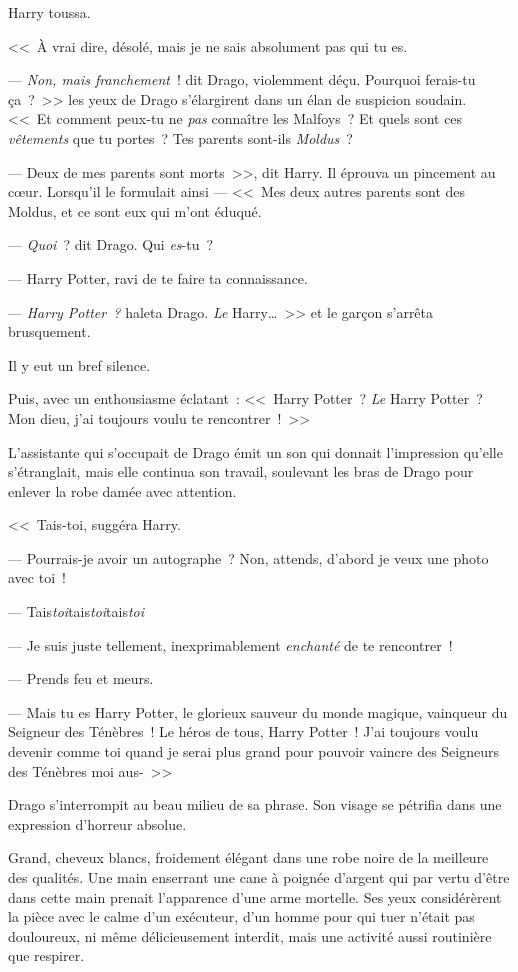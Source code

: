 Harry toussa. 

<<~À vrai dire, désolé, mais je ne sais absolument pas qui tu es.

--- \emph{Non, mais franchement}~! dit Drago, violemment déçu. Pourquoi ferais-tu ça~?~>> les yeux de Drago s'élargirent dans un élan de suspicion soudain. <<~Et comment peux-tu ne \emph{pas} connaître les Malfoys~? Et quels sont ces \emph{vêtements} que tu portes~? Tes parents sont-ils \emph{Moldus}~?

--- Deux de mes parents sont morts~>>, dit Harry. Il éprouva un pincement au cœur. Lorsqu'il le formulait ainsi — <<~Mes deux autres parents sont des Moldus, et ce sont eux qui m'ont éduqué.

--- \emph{Quoi}~? dit Drago. Qui \emph{es}-tu~?

--- Harry Potter, ravi de te faire ta connaissance.

--- \emph{Harry Potter~?} haleta Drago. \emph{Le} Harry…~>> et le garçon s'arrêta brusquement.

Il y eut un bref silence.

Puis, avec un enthousiasme éclatant~: <<~Harry Potter~? \emph{Le} Harry Potter~? Mon dieu, j'ai toujours voulu te rencontrer~!~>>

L'assistante qui s'occupait de Drago émit un son qui donnait l'impression qu'elle s'étranglait, mais elle continua son travail, soulevant les bras de Drago pour enlever la robe damée avec attention.

<<~Tais-toi, suggéra Harry.

--- Pourrais-je avoir un autographe~? Non, attends, d'abord je veux une photo avec toi~!

--- Tais\emph{toi}tais\emph{toi}tais\emph{toi}

--- Je suis juste tellement, inexprimablement \emph{enchanté} de te rencontrer~!

--- Prends feu et meurs.

--- Mais tu es Harry Potter, le glorieux sauveur du monde magique, vainqueur du Seigneur des Ténèbres~! Le héros de tous, Harry Potter~! J'ai toujours voulu devenir comme toi quand je serai plus grand pour pouvoir vaincre des Seigneurs des Ténèbres moi aus-~>>

Drago s'interrompit au beau milieu de sa phrase. Son visage se pétrifia dans une expression d'horreur absolue.

Grand, cheveux blancs, froidement élégant dans une robe noire de la meilleure des qualités. Une main enserrant une cane à poignée d'argent qui par vertu d'être dans cette main prenait l'apparence d'une arme mortelle. Ses yeux considérèrent la pièce avec le calme d'un exécuteur, d'un homme pour qui tuer n'était pas douloureux, ni même délicieusement interdit, mais une activité aussi routinière que respirer.


